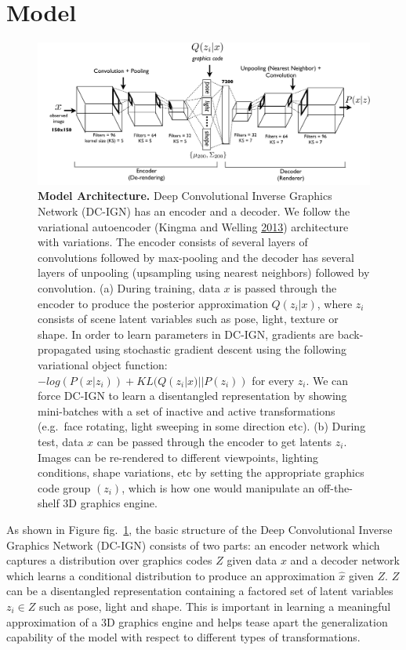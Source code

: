 \documentclass[12pt,twoside]{mitthesis}
\begin{document}
\section{Model}\label{model}

\begin{figure}[htbp]
\centering
\includegraphics{../figures/overview.pdf}
\caption{\label{fig:overview}\textbf{Model Architecture.} Deep
Convolutional Inverse Graphics Network (DC-IGN) has an encoder and a
decoder. We follow the variational autoencoder (Kingma and Welling
\protect\hyperlink{ref-kingma2013auto}{2013}) architecture with
variations. The encoder consists of several layers of convolutions
followed by max-pooling and the decoder has several layers of unpooling
(upsampling using nearest neighbors) followed by convolution. (a) During
training, data \(x\) is passed through the encoder to produce the
posterior approximation \(Q(z_i|x)\), where \(z_i\) consists of scene
latent variables such as pose, light, texture or shape. In order to
learn parameters in DC-IGN, gradients are back-propagated using
stochastic gradient descent using the following variational object
function: \(-log(P(x|z_i)) + KL(Q(z_i|x)||P(z_i))\) for every \(z_i\).
We can force DC-IGN to learn a disentangled representation by showing
mini-batches with a set of inactive and active transformations
(e.g.~face rotating, light sweeping in some direction etc). (b) During
test, data \(x\) can be passed through the encoder to get latents
\(z_i\). Images can be re-rendered to different viewpoints, lighting
conditions, shape variations, etc by setting the appropriate graphics
code group \((z_i)\), which is how one would manipulate an off-the-shelf
3D graphics engine.}
\end{figure}

As shown in Figure fig.~\ref{fig:overview}, the basic structure of the
Deep Convolutional Inverse Graphics Network (DC-IGN) consists of two
parts: an encoder network which captures a distribution over graphics
codes \(Z\) given data \(x\) and a decoder network which learns a
conditional distribution to produce an approximation \(\hat{x}\) given
\(Z\). \(Z\) can be a disentangled representation containing a factored
set of latent variables \(z_i \in Z\) such as pose, light and shape.
This is important in learning a meaningful approximation of a 3D
graphics engine and helps tease apart the generalization capability of
the model with respect to different types of transformations.
\end{document}
